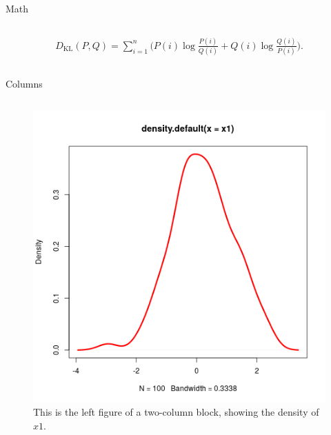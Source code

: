 \documentclass[final]{beamer}
\newcommand\sumin{\sum_{i=1}^{n}}
\newcommand{\Xoi}[1]{#1(i)}
\newcommand{\frakPQ}[2]{\frac{\Xoi{#1}}{\Xoi{#2}}}
\newcommand{\DKLPQ}[3]{D_{\mathrm{KL}}(#1 #3 #2)}
\begin{document}
\begin{frame}[fragile,label={sec:org954d466}]{}
\begin{columns}
\begin{column}[t]{0.45\columnwidth}
\begin{block}{Math}
\begin{columns}
\begin{column}[T]{0.78\columnwidth}
\begin{align} 
\label{eq:KL2} 
\DKLPQ{P}{Q}{,} = \sumin \Big(\Xoi{P} \log \frakPQ{P}{Q} + \Xoi{Q} \log \frakPQ{Q}{P} \Big).
\end{align}
\end{column}
\end{columns}
\end{block}

\begin{block}{Columns}
\begin{columns}
\begin{column}[T]{0.48\columnwidth}
\captionsetup{justification=justified,width=.85\linewidth}
\begin{figure}[htbp]
\centering
\includegraphics[width=.9\linewidth]{4l.png}
\caption{\label{fig:org0b56e4b}
This is the left figure of a two-column block, showing the density of \(x1\).}
\end{figure}
\end{column}


\end{columns}
\end{block}
\end{column}
\end{columns}
\end{frame}
\end{document}
